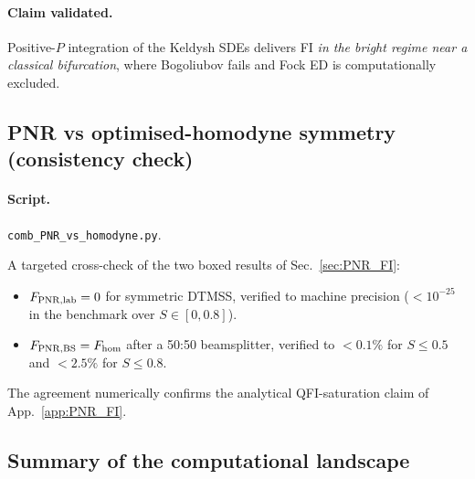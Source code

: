 \documentclass[11pt]{article}
\begin{document}
\paragraph{Claim validated.}  Positive-$P$ integration of the Keldysh
SDEs delivers FI \emph{in the bright regime near a classical
bifurcation}, where Bogoliubov fails and Fock ED is computationally
excluded.

\subsection{PNR vs optimised-homodyne symmetry (consistency check)}
\label{sec:num_pnr_hom}

\paragraph{Script.} \texttt{comb\_PNR\_vs\_homodyne.py}.

A targeted cross-check of the two boxed results of Sec.~\ref{sec:PNR_FI}:
\begin{itemize}\itemsep0em
\item $F_{\rm PNR,lab} = 0$ for symmetric DTMSS, verified to machine
      precision ($< 10^{-25}$ in the benchmark over $S\in[0,0.8]$).
\item $F_{\rm PNR,BS} = F_{\rm hom}$ after a 50:50 beamsplitter,
      verified to $<0.1\%$ for $S\leq 0.5$ and $<2.5\%$ for $S\leq 0.8$.
\end{itemize}
The agreement numerically confirms the analytical QFI-saturation claim
of App.~\ref{app:PNR_FI}.

\subsection{Summary of the computational landscape}
\end{document}
